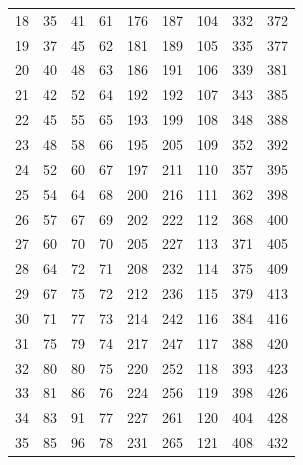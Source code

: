 \begin{table}[H]
\begin{tabular}{ccc|ccc|ccc}
		18  & 35         & 41           & 61  & 176        & 187          & 104 & 332        & 372          \\
		19  & 37         & 45           & 62  & 181        & 189          & 105 & 335        & 377          \\
		20  & 40         & 48           & 63  & 186        & 191          & 106 & 339        & 381          \\
		21  & 42         & 52           & 64  & 192        & 192          & 107 & 343        & 385          \\
		22  & 45         & 55           & 65  & 193        & 199          & 108 & 348        & 388          \\
		23  & 48         & 58           & 66  & 195        & 205          & 109 & 352        & 392          \\
		24  & 52         & 60           & 67  & 197        & 211          & 110 & 357        & 395          \\
		25  & 54         & 64           & 68  & 200        & 216          & 111 & 362        & 398          \\
		26  & 57         & 67           & 69  & 202        & 222          & 112 & 368        & 400          \\
		27  & 60         & 70           & 70  & 205        & 227          & 113 & 371        & 405          \\
		28  & 64         & 72           & 71  & 208        & 232          & 114 & 375        & 409          \\
		29  & 67         & 75           & 72  & 212        & 236          & 115 & 379        & 413          \\
		30  & 71         & 77           & 73  & 214        & 242          & 116 & 384        & 416          \\
		31  & 75         & 79           & 74  & 217        & 247          & 117 & 388        & 420          \\
		32  & 80         & 80           & 75  & 220        & 252          & 118 & 393        & 423          \\
		33  & 81         & 86           & 76  & 224        & 256          & 119 & 398        & 426          \\
		34  & 83         & 91           & 77  & 227        & 261          & 120 & 404        & 428          \\
		35  & 85         & 96           & 78  & 231        & 265          & 121 & 408        & 432          \\

\end{tabular}
\end{table}
